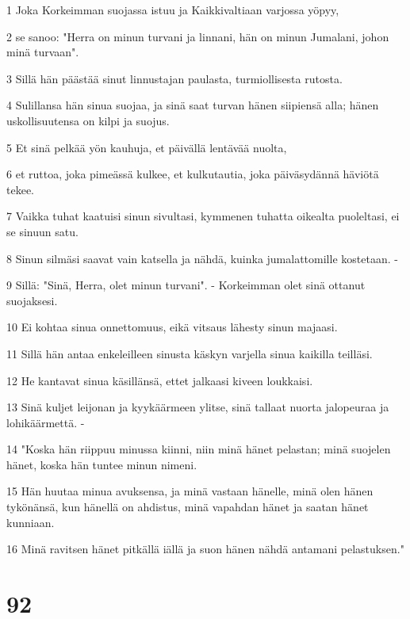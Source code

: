 \par 1 Joka Korkeimman suojassa istuu ja Kaikkivaltiaan varjossa yöpyy,
\par 2 se sanoo: "Herra on minun turvani ja linnani, hän on minun Jumalani, johon minä turvaan".
\par 3 Sillä hän päästää sinut linnustajan paulasta, turmiollisesta rutosta.
\par 4 Sulillansa hän sinua suojaa, ja sinä saat turvan hänen siipiensä alla; hänen uskollisuutensa on kilpi ja suojus.
\par 5 Et sinä pelkää yön kauhuja, et päivällä lentävää nuolta,
\par 6 et ruttoa, joka pimeässä kulkee, et kulkutautia, joka päiväsydännä häviötä tekee.
\par 7 Vaikka tuhat kaatuisi sinun sivultasi, kymmenen tuhatta oikealta puoleltasi, ei se sinuun satu.
\par 8 Sinun silmäsi saavat vain katsella ja nähdä, kuinka jumalattomille kostetaan. -
\par 9 Sillä: "Sinä, Herra, olet minun turvani". - Korkeimman olet sinä ottanut suojaksesi.
\par 10 Ei kohtaa sinua onnettomuus, eikä vitsaus lähesty sinun majaasi.
\par 11 Sillä hän antaa enkeleilleen sinusta käskyn varjella sinua kaikilla teilläsi.
\par 12 He kantavat sinua käsillänsä, ettet jalkaasi kiveen loukkaisi.
\par 13 Sinä kuljet leijonan ja kyykäärmeen ylitse, sinä tallaat nuorta jalopeuraa ja lohikäärmettä. -
\par 14 "Koska hän riippuu minussa kiinni, niin minä hänet pelastan; minä suojelen hänet, koska hän tuntee minun nimeni.
\par 15 Hän huutaa minua avuksensa, ja minä vastaan hänelle, minä olen hänen tykönänsä, kun hänellä on ahdistus, minä vapahdan hänet ja saatan hänet kunniaan.
\par 16 Minä ravitsen hänet pitkällä iällä ja suon hänen nähdä antamani pelastuksen."

\chapter{92}


